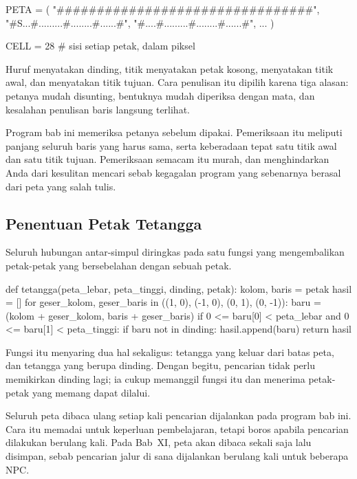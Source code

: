 \begin{kodekeluaran}
PETA = (
    "################################",
    "#S...#.........#........#......#",
    "#....#.........#........#......#",
    ...
)

CELL = 28        # sisi setiap petak, dalam piksel
\end{kodekeluaran}

Huruf \code{#} menyatakan dinding, titik menyatakan petak kosong, 
menyatakan titik awal, dan  menyatakan titik tujuan. Cara penulisan itu
dipilih karena tiga alasan: petanya mudah disunting, bentuknya mudah
diperiksa dengan mata, dan kesalahan penulisan baris langsung terlihat.

Program bab ini memeriksa petanya sebelum dipakai. Pemeriksaan itu meliputi
panjang seluruh baris yang harus sama, serta keberadaan tepat satu titik awal
dan satu titik tujuan. Pemeriksaan semacam itu murah, dan menghindarkan Anda
dari kesulitan mencari sebab kegagalan program yang sebenarnya berasal dari
peta yang salah tulis.

\subsection{Penentuan Petak Tetangga}

Seluruh hubungan antar-simpul diringkas pada satu fungsi yang mengembalikan
petak-petak yang bersebelahan dengan sebuah petak.

\begin{kodekeluaran}
def tetangga(peta_lebar, peta_tinggi, dinding, petak):
    kolom, baris = petak
    hasil = []
    for geser_kolom, geser_baris in ((1, 0), (-1, 0), (0, 1), (0, -1)):
        baru = (kolom + geser_kolom, baris + geser_baris)
        if 0 <= baru[0] < peta_lebar and 0 <= baru[1] < peta_tinggi:
            if baru not in dinding:
                hasil.append(baru)
    return hasil
\end{kodekeluaran}

Fungsi itu menyaring dua hal sekaligus: tetangga yang
keluar dari batas peta, dan tetangga yang berupa dinding. Dengan begitu,
pencarian tidak perlu memikirkan dinding lagi; ia cukup memanggil fungsi itu
dan menerima petak-petak yang memang dapat dilalui.

\begin{catatabox}
Seluruh peta dibaca ulang setiap kali pencarian
dijalankan pada program bab ini. Cara itu memadai untuk keperluan pembelajaran,
tetapi boros apabila pencarian dilakukan berulang kali. Pada Bab~XI, peta akan
dibaca sekali saja lalu disimpan, sebab pencarian jalur di sana dijalankan
berulang kali untuk beberapa NPC.
\end{catatabox}
